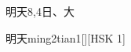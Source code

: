 \begin{entry}{明天}{8,4}{⽇、⼤}
  \begin{phonetics}{明天}{ming2tian1}[][HSK 1]
  \end{phonetics}
\end{entry}
